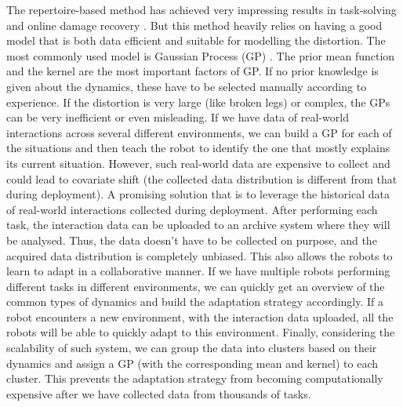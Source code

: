 The repertoire-based method has achieved very impressing results in task-solving \cite{EvoRBC} and online damage recovery \cite{RTE}. 
But this method heavily relies on having a good model that is both data efficient and suitable for modelling the distortion. 
The most commonly used model is Gaussian Process (GP) \cite{GP}. The prior mean function and the kernel are the most important factors of GP. 
If no prior knowledge is given about the dynamics, these  have to be selected manually according to experience.
If the distortion is very large (like broken legs) or complex, the GPs can be very inefficient or even misleading.
If we have data of real-world interactions across several different environments, we can build a GP for each of the situations and then teach the robot to identify the one that mostly explains its current situation. However, such real-world data are expensive to collect and could lead to covariate shift (the collected data distribution is different from that during deployment).
A promising solution that is to leverage the historical data of real-world interactions collected during deployment. 
After performing each task, the interaction data can be uploaded to an archive system where they will be analysed. 
Thus, the data doesn't have to be collected on purpose, and the acquired data distribution is completely unbiased. 
This also allows the robots to learn to adapt in a collaborative manner.
If we have multiple robots performing different tasks in different environments, we can quickly get an overview of the  common types of dynamics and build the adaptation strategy accordingly. 
If a robot encounters a new environment, with the interaction data uploaded, all the robots will be able to quickly adapt to this environment.
Finally, considering the scalability of such system, we can group the data into clusters based on their dynamics and assign a GP (with the corresponding mean and kernel) to each cluster. This prevents the adaptation strategy from becoming computationally expensive after we have collected data from thousands of tasks.

